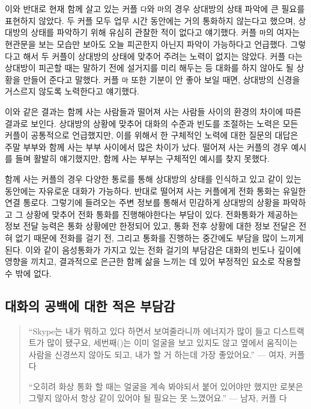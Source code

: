 이와 반대로 현재 함께 살고 있는 커플 \texttt{다}와 \texttt{마}의 경우 상대방의 상태 파악에 큰 필요를 표현하지 않았다. 두 커플 모두 업무 시간 동안에는 거의 통화하지 않는다고 했으며, 상대방의 상태를 파악하기 위해 유심히 관찰한 적이 없다고 얘기했다. 커플 \texttt{마}의 여자는 현관문을 보는 모습만 보아도 오늘 피곤한지 아닌지 파악이 가능하다고 언급했다. 그렇다고 해서 두 커플이 상대방의 상태에 맞추어 주려는 노력이 없지는 않았다. 커플 \texttt{다}는 상대방이 피곤할 때는 말하기 전에 설거지를 미리 해두는 등 대화를 하지 않아도 될 상황을 만들어 준다고 말했다. 커플 \texttt{마} 또한 기분이 안 좋아 보일 때면, 상대방의 신경을 거스르지 않도록 노력한다고 얘기했다.

이와 같은 결과는 함께 사는 사람들과 떨어져 사는 사람들 사이의 환경의 차이에 따른 결과로 보인다. 상대방의 상황에 맞추어 대화의 수준과 빈도를 조절하는 노력은 모든 커플이 공통적으로 언급했지만, 이를 위해서 한 구체적인 노력에 대한 질문의 대답은 주말 부부와 함께 사는 부부 사이에서 많은 차이가 났다. 떨어져 사는 커플의 경우 예시를 들며 활발히 얘기했지만, 함께 사는 부부는 구체적인 예시를 찾지 못했다.

함께 사는 커플의 경우 다양한 통로를 통해 상대방의 상태를 인식하고 있고 같이 있는 동안에는 자유로운 대화가 가능하다. 반대로 떨어져 사는 커플에게 전화 통화는 유일한 연결 통로다. 그렇기에 들려오는 주변 정보를 통해서 민감하게 상대방의 상황을 파악하고 그 상황에 맞추어 전화 통화를 진행해야한다는 부담이 있다.  전화 통화가 제공하는 정보 전달 능력은 통화 상황에만 한정되어 있고, 통화 전후 상황에 대한 정보 전달은 전혀 없기 때문에 전화를 걸기 전, 그리고 통화를 진행하는 중간에도 부담을 많이 느끼게 된다. 이와 같이 음성 통화가 가지고 있는 전화 걸기의 부담감은 대화의 빈도나 깊이에 영향을 끼치고, 결과적으로 은근한 함께 삶을 느끼는 데 있어 부정적인 요소로 작용할 수 밖에 없다.


\subsection{대화의 공백에 대한 적은 부담감}

\begin{quote}
``Skype는 내가 뭐하고 있다 하면서 보여줄라니까 에너지가 많이 들고 디스트랙트가 많이 됐구요, 세번째(\sysname)는 이미 얼굴을 보고 있지도 않고 옆에서 움직이는 사람을 신경쓰지 않아도 되고, 내가 할 거 하는데 가장 좋았어요.'' --- 여자, 커플 다

``오히려 화상 통화 할 때는 얼굴을 계속 봐야되서 붙어 있어야만 했지만 로봇은 그렇지 않아서 항상 같이 있어야 될 필요는 못 느꼈어요.'' --- 남자, 커플 다
\end{quote}

